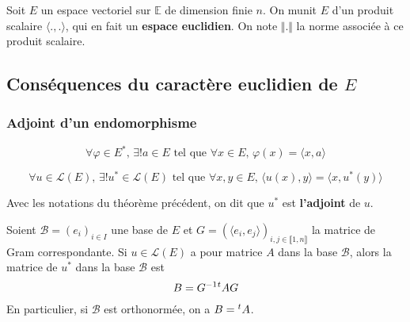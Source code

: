 



	
	Soit $E$ un espace vectoriel sur $\mathbb{E}$ de dimension finie $n$. On munit $E$ d'un produit scalaire $\langle . , . \rangle$, qui en fait un \textbf{espace euclidien}. On note $\Vert . \Vert$ la norme associée à ce produit scalaire.
	
	\subsection{Conséquences du caractère euclidien de \texorpdfstring{$E$}{E}}
	
	\subsubsection{Adjoint d'un endomorphisme}
	
	
	\begin{lemma}
		\[ \forall \varphi \in E^*, \, \exists! a \in E \text{ tel que } \forall x \in E, \, \varphi(x) = \langle x, a \rangle \]
	\end{lemma}
	
	\begin{theorem}
		\[ \forall u \in \mathcal{L}(E), \, \exists! u^* \in \mathcal{L}(E) \text{ tel que } \forall x, y \in E, \, \langle u(x), y \rangle = \langle x, u^*(y) \rangle \]
	\end{theorem}
	
	\begin{definition}
		Avec les notations du théorème précédent, on dit que $u^*$ est \textbf{l'adjoint} de $u$.
	\end{definition}
	
	\begin{theorem}
		Soient $\mathcal{B} = (e_i)_{i \in I}$ une base de $E$ et $G = (\langle e_i, e_j \rangle)_{i,j \in \llbracket 1, n \rrbracket}$ la matrice de Gram correspondante. Si $u \in \mathcal{L}(E)$ a pour matrice $A$ dans la base $\mathcal{B}$, alors la matrice de $u^*$ dans la base $\mathcal{B}$ est
		\[ B = G^{-1} \mathstrut ^t A G \]
		En particulier, si $\mathcal{B}$ est orthonormée, on a $B = \mathstrut ^t A$.
	\end{theorem}
	
	
